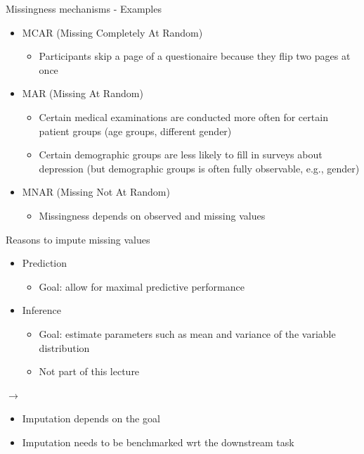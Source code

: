 \documentclass[10pt,compress,t,notes=noshow, xcolor=table]{beamer}
\begin{document}
\begin{frame}{Missingness mechanisms - Examples}
    \vfill
    \begin{itemize}
        \item MCAR (Missing Completely At Random)
        \begin{itemize}
            \item Participants skip a page of a questionaire because they flip two pages at once
        \end{itemize}
        \item MAR (Missing At Random)
        \begin{itemize}
            \item Certain medical examinations are conducted more often for certain patient groups (age groups, different gender)
            \item Certain demographic groups are less likely to fill in surveys about depression (but demographic groups is often fully observable, e.g., gender)
        \end{itemize}
        \item MNAR (Missing Not At Random)
        \begin{itemize}
            \item Missingness depends on observed and missing values
        \end{itemize}
    \end{itemize}    
    \vfill
\end{frame}

\begin{frame}{Reasons to impute missing values}
    \vfill
    \begin{itemize}
        \item Prediction
        \begin{itemize}
            \item Goal: allow for maximal predictive performance
        \end{itemize}
        \item Inference
        \begin{itemize}
            \item Goal: estimate parameters such as mean and variance of the variable distribution
            \item Not part of this lecture
        \end{itemize}
    \end{itemize}
    \vfill
    $\rightarrow$ 
    \begin{itemize}
        \item Imputation depends on the goal
        \item Imputation needs to be benchmarked wrt the downstream task
    \end{itemize}
    \vfill
\end{frame}
\end{document}
